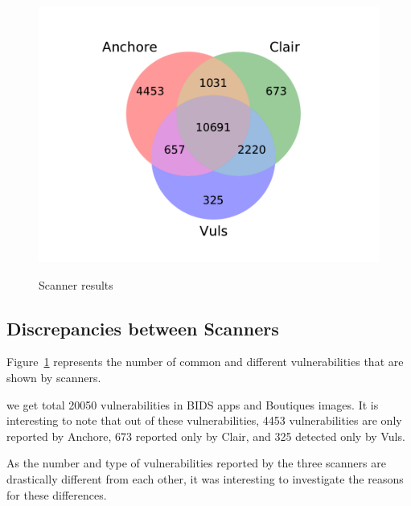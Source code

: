 \documentclass[a4paper,num-refs]{oup-contemporary}
\begin{document}
\begin{figure}[!ht]
        {\includegraphics[scale=2.5,width=\columnwidth]
        {Figures/venn.pdf}}
        \caption{\label{fig:venn} Scanner results}
\end{figure}


\subsection{Discrepancies between Scanners}

Figure~\ref{fig:venn} represents the number of common and different vulnerabilities
that are shown by scanners.

we get total 20050 vulnerabilities in BIDS apps and Boutiques images.
It is interesting to note that out of these vulnerabilities, 4453 vulnerabilities are only
reported by Anchore, 673 reported only by Clair, and 325 detected only by Vuls.

As the number and type of vulnerabilities reported by the three scanners are drastically different from each other,
it was interesting to investigate the reasons for these differences.
\end{document}
